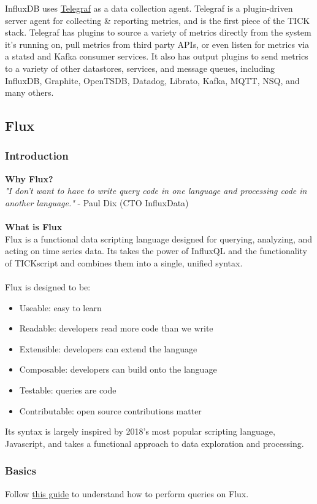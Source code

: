 \documentclass[10pt,a4paper]{article}
\newcommand{\nline}{\\~\\}
\begin{document}
 InfluxDB uses \href{https://docs.influxdata.com/telegraf/v1.16/}{Telegraf} as a data collection agent. Telegraf is a plugin-driven server agent for collecting \& reporting metrics, and is the first piece of the TICK stack. Telegraf has plugins to source a variety of metrics directly from the system it’s running on, pull metrics from third party APIs, or even listen for metrics via a statsd and Kafka consumer services. It also has output plugins to send metrics to a variety of other datastores, services, and message queues, including InfluxDB, Graphite, OpenTSDB, Datadog, Librato, Kafka, MQTT, NSQ, and many others.
 
 \subsection{Flux}
 \subsubsection{Introduction}
 \textbf{Why Flux?} \\
 \textit{"I don't want to have to write query code in one language and processing code in another language."} - Paul Dix (CTO InfluxData) \nline
 \textbf{What is Flux} \\
 Flux is a functional data scripting language designed for querying, analyzing, and acting on time series data. Its takes the power of InfluxQL and the functionality of TICKscript and combines them into a single, unified syntax. \nline
 Flux is designed to be:
 \begin{itemize}
 	\item Useable: easy to learn
 	\item Readable: developers read more code than we write
 	\item Extensible: developers can extend the language
 	\item Composable: developers can build onto the language
 	\item Testable: queries are code
 	\item Contributable: open source contributions matter
\end{itemize}
 Its syntax is largely inspired by 2018’s most popular scripting language, Javascript, and takes a functional approach to data exploration and processing.
 
\subsubsection{Basics}
Follow \href{https://docs.influxdata.com/influxdb/v1.8/flux/guides/}{this guide} to understand how to perform queries on Flux.
 
\end{document}
